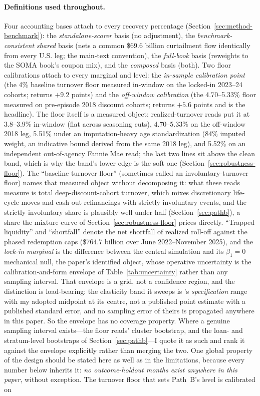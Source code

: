 \documentclass[12pt]{article}
\begin{document}
\paragraph{Definitions used throughout.} Four accounting bases attach to every recovery percentage (Section~\ref{sec:method-benchmark}): the \emph{standalone-scorer} basis (no adjustment), the \emph{benchmark-consistent shared} basis (nets a common \$69.6 billion curtailment flow identically from every U.S. leg; the main-text convention), the \emph{full-book} basis (reweights to the SOMA book's coupon mix), and the \emph{composed} basis (both). Two floor calibrations attach to every marginal and level: the \emph{in-sample calibration point} (the 4\% baseline turnover floor measured in-window on the locked-in 2023--24 cohorts; returns $+9.2$ points) and the \emph{off-window calibration} (the 4.70--5.33\% floor measured on pre-episode 2018 discount cohorts; returns $+5.6$ points and is the headline). The floor itself is a measured object: realized-turnover reads put it at 3.8--3.9\% in-window (flat across seasoning cuts), 4.70--5.33\% on the off-window 2018 leg, 5.51\% under an imputation-heavy age standardization (84\% imputed weight, an indicative bound derived from the same 2018 leg), and 5.52\% on an independent out-of-agency Fannie Mae read; the last two lines sit above the clean band, which is why the band's lower edge is the soft one (Section~\ref{sec:robustness-floor}). The ``baseline turnover floor'' (sometimes called an involuntary-turnover floor) names that measured object without decomposing it: what these reads measure is total deep-discount-cohort turnover, which mixes discretionary life-cycle moves and cash-out refinancings with strictly involuntary events, and the strictly-involuntary share is plausibly well under half (Section~\ref{sec:pathb}), a share the mixture curve of Section~\ref{sec:robustness-floor} prices directly. ``Trapped liquidity'' and ``shortfall'' denote the net shortfall of realized roll-off against the phased redemption caps (\$764.7 billion over June 2022--November 2025), and the \emph{lock-in marginal} is the difference between the central simulation and its $\beta_1 = 0$ mechanical null, the paper's identified object, whose operative uncertainty is the calibration-and-form envelope of Table~\ref{tab:uncertainty} rather than any sampling interval. That envelope is a grid, not a confidence region, and the distinction is load-bearing: the elasticity band it sweeps is \citeauthor{liebersohn2024}'s \emph{specification} range with my adopted midpoint at its centre, not a published point estimate with a published standard error, and no sampling error of theirs is propagated anywhere in this paper. So the envelope has no coverage property. Where a genuine sampling interval exists---the floor reads' cluster bootstrap, and the loan- and stratum-level bootstraps of Section~\ref{sec:pathb}---I quote it as such and rank it against the envelope explicitly rather than merging the two. One global property of the design should be stated here as well as in the limitations, because every number below inherits it: \emph{no outcome-holdout months exist anywhere in this paper}, without exception. The turnover floor that sets Path~B's level is calibrated on 
\end{document}
